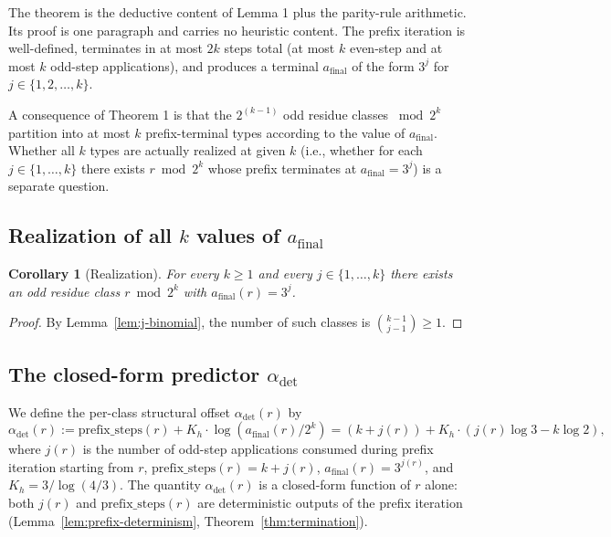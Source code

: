 \documentclass[pdflatex,sn-mathphys-num]{sn-jnl}
\theoremstyle{thmstyleone}%
\newtheorem{corollary}[theorem]{Corollary}
\theoremstyle{definition}
\theoremstyle{plain}
\begin{document}
The theorem is the deductive content of Lemma 1 plus the parity-rule arithmetic. Its proof is one paragraph and carries no heuristic content. The prefix iteration is well-defined, terminates in at most $2k$ steps total (at most $k$ even-step and at most $k$ odd-step applications), and produces a terminal $a_{\text{final}}$ of the form $3^j$ for $j \in \{1, 2, \ldots, k\}$.

A consequence of Theorem 1 is that the $2^{(k-1)}$ odd residue classes $\bmod 2^k$ partition into at most $k$ prefix-terminal types according to the value of $a_{\text{final}}$. Whether all $k$ types are actually realized at given $k$ (i.e., whether for each $j \in \{1, \ldots, k\}$ there exists $r \bmod 2^k$ whose prefix terminates at $a_{\text{final}} = 3^j$) is a separate question.

\subsection{Realization of all $k$ values of $a_{\text{final}}$}
\label{sec:realization}
\begin{corollary}[Realization]
\label{cor:realization}
For every $k \geq 1$ and every $j \in \{1, \ldots, k\}$ there exists an odd residue class $r \bmod 2^k$ with $a_{\text{final}}(r) = 3^j$.
\end{corollary}

\begin{proof}
    By Lemma~\ref{lem:j-binomial}, the number of such classes is $\binom{k-1}{j-1} \geq 1$.
\end{proof}

\subsection{The closed-form predictor \texorpdfstring{$\alpha_{\text{det}}$}{alpha-det}}
\label{sec:closed-form}
We define the per-class structural offset $\alpha_{\text{det}}(r)$ by
$$\alpha_{\text{det}}(r) := \text{prefix\_steps}(r) + K_h \cdot \log(a_{\text{final}}(r)/2^k) = (k + j(r)) + K_h \cdot (j(r) \log 3 - k \log 2),$$
where $j(r)$ is the number of odd-step applications consumed during prefix iteration starting from $r$, $\text{prefix\_steps}(r) = k + j(r)$, $a_{\text{final}}(r) = 3^{j(r)}$, and $K_h = 3/\log(4/3)$. The quantity $\alpha_{\text{det}}(r)$ is a closed-form function of $r$ alone: both $j(r)$ and $\text{prefix\_steps}(r)$ are deterministic outputs of the prefix iteration (Lemma~\ref{lem:prefix-determinism}, Theorem~\ref{thm:termination}).
\end{document}
